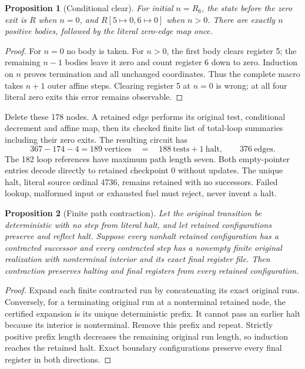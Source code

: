 \documentclass[11pt]{article}
\newtheorem{proposition}{Proposition}[section]
\begin{document}
\begin{proposition}[Conditional clear]
For initial $n=R_6$, the state before the zero exit is $R$ when $n=0$, and $R[5\mapsto0,6\mapsto0]$ when $n>0$. There are exactly $n$ positive bodies, followed by the literal zero-edge map once.
\end{proposition}
\begin{proof}
For $n=0$ no body is taken. For $n>0$, the first body clears register 5; the remaining $n-1$ bodies leave it zero and count register 6 down to zero. Induction on $n$ proves termination and all unchanged coordinates. Thus the complete macro takes $n+1$ outer affine steps. Clearing register 5 at $n=0$ is wrong; at all four literal zero exits this error remains observable.
\end{proof}

Delete these 178 nodes. A retained edge performs its original test, conditional decrement and affine map, then its checked finite list of total-loop summaries including their zero exits. The resulting circuit has
\[
 367-174-4=189\ \text{vertices}
 \quad=\quad188\ \text{tests}+1\ \text{halt},\qquad376\ \text{edges}.
\]
The 182 loop references have maximum path length seven. Both empty-pointer entries decode directly to retained checkpoint 0 without updates. The unique halt, literal source ordinal 4736, remains retained with no successors. Failed lookup, malformed input or exhausted fuel must reject, never invent a halt.

\begin{proposition}[Finite path contraction]
Let the original transition be deterministic with no step from literal halt, and let retained configurations preserve and reflect halt. Suppose every nonhalt retained configuration has a contracted successor and every contracted step has a nonempty finite original realization with nonterminal interior and its exact final register file. Then contraction preserves halting and final registers from every retained configuration.
\end{proposition}
\begin{proof}
Expand each finite contracted run by concatenating its exact original runs. Conversely, for a terminating original run at a nonterminal retained node, the certified expansion is its unique deterministic prefix. It cannot pass an earlier halt because its interior is nonterminal. Remove this prefix and repeat. Strictly positive prefix length decreases the remaining original run length, so induction reaches the retained halt. Exact boundary configurations preserve every final register in both directions.
\end{proof}
\end{document}
